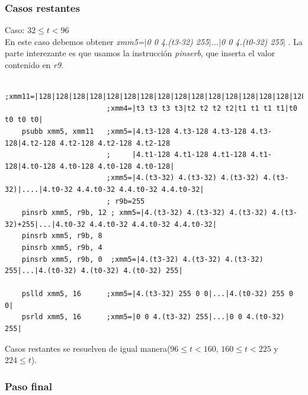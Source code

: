 \subsubsection*{Casos restantes}
Caso: $32 \leq t < 96$ \\
En este caso debemos obtener \emph{xmm5=$|$0 0 4.(t3-32) 255$|$...$|$0 0 4.(t0-32) 255$|$ }. 
La parte interezante es que usamos la instrucción \emph{pinserb}, que inserta el valor contenido en \emph{r9}.
\begin{codesnippet}
\begin{verbatim}				
                        ;xmm11=|128|128|128|128|128|128|128|128|128|128|128|128|128|128|128|128|
                        ;xmm4=|t3 t3 t3 t3|t2 t2 t2 t2|t1 t1 t1 t1|t0 t0 t0 t0|
    psubb xmm5, xmm11   ;xmm5=|4.t3-128 4.t3-128 4.t3-128 4.t3-128|4.t2-128 4.t2-128 4.t2-128 4.t2-128
                        ;     |4.t1-128 4.t1-128 4.t1-128 4.t1-128|4.t0-128 4.t0-128 4.t0-128 4.t0-128|
                        ;xmm5=|4.(t3-32) 4.(t3-32) 4.(t3-32) 4.(t3-32)|....|4.t0-32 4.4.t0-32 4.4.t0-32 4.4.t0-32|                           
                        ; r9b=255
    pinsrb xmm5, r9b, 12 ; xmm5=|4.(t3-32) 4.(t3-32) 4.(t3-32) 4.(t3-32)+255|...|4.t0-32 4.4.t0-32 4.4.t0-32 4.4.t0-32|
    pinsrb xmm5, r9b, 8  
    pinsrb xmm5, r9b, 4
    pinsrb xmm5, r9b, 0  ;xmm5=|4.(t3-32) 4.(t3-32) 4.(t3-32) 255|...|4.(t0-32) 4.(t0-32) 4.(t0-32) 255|                    

    pslld xmm5, 16      ;xmm5=|4.(t3-32) 255 0 0|...|4.(t0-32) 255 0 0|
    psrld xmm5, 16      ;xmm5=|0 0 4.(t3-32) 255|...|0 0 4.(t0-32) 255|                    
\end{verbatim}
\end{codesnippet}
Casos restantes se resuelven de igual manera($96\leq t < 160$, $160\leq t <225$ y  $224 \leq t$).

\subsubsection*{Paso final}

